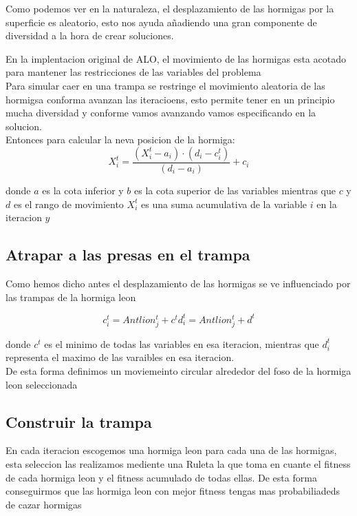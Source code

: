   Como podemos ver en la naturaleza, el desplazamiento de las hormigas por la superficie es aleatorio, esto nos ayuda 
  añadiendo una gran componente de diversidad a la hora de crear soluciones.

  En la implentacion original de ALO, el movimiento de las hormigas esta acotado para mantener las restricciones de las variables 
  del problema\\
  Para simular caer en una trampa se restringe el movimiento aleatoria de las hormigsa conforma avanzan las iteracioens, esto permite tener en un principio mucha diversidad y conforme vamos
  avanzando vamos especificando en la solucion.\\

  Entonces para calcular la neva posicion de la hormiga: \\
  \begin{equation}
    X_i^t = \frac{(X_i^t -a_i ) \cdot (d_i -c_i^t)}{(d_i -a_i)} + c_i
  \end{equation}

  donde $a$ es la cota inferior y $b$ es la cota superior de las variables mientras que $c$ y $d$ es el rango de movimiento
  $X_i^t $ es una suma acumulativa de la variable $i$ en la iteracion $y$
  
  \subsection{Atrapar a las presas en el trampa}

  Como hemos dicho antes el desplazamiento de las hormigas se ve influenciado por las trampas de la hormiga leon

  \begin{equation}
    c_i^t = Antlion_j^t +c^t
    d_i^t = Antlion_j^t +d^t
  \end{equation}

  donde $c^t$ es el minimo de todas las variables en esa iteracion, mientras que $d_i^t$ representa el maximo 
  de las varaibles en esa iteracion.\\
  De esta forma definimos un moviemeinto circular alrededor del foso de la hormiga leon seleccionada

  \subsection{Construir la trampa}

  En cada iteracion escogemos una hormiga leon para cada una de las hormigas, esta seleccion las realizamos mediente una 
  Ruleta la que toma en cuante el fitness de cada hormiga leon y el fitness acumulado de todas ellas. 
  De esta forma conseguirmos que las hormiga leon con mejor fitness tengas mas probabiliadeds de cazar hormigas

